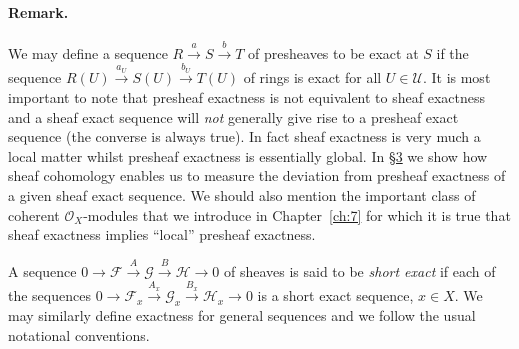 \paragraph{Remark.}
We may define a sequence $R\xrightarrow{a}S\xrightarrow{b}T$ of presheaves to be exact at $S$ if the sequence $R(U)\xrightarrow{a_U}S(U)\xrightarrow{b_U}T(U)$ of rings is exact for all $U\in\mathcal U$. It is most important to note that presheaf exactness is not equivalent to sheaf exactness and a sheaf exact sequence will \emph{not} generally give rise to a presheaf exact sequence (the converse is always true). In fact sheaf exactness is very much a local matter whilst presheaf exactness is essentially global. In \hyperref[sec:6:3]{\S3} we show how sheaf cohomology enables us to measure the deviation from presheaf exactness of a given sheaf exact sequence. We should also mention the important class of coherent $\mathcal O_X$-modules that we introduce in Chapter~\ref{ch:7} for which it is true that sheaf exactness implies ``local'' presheaf exactness.

A sequence $0\to\mathcal F\xrightarrow{A}\mathcal G\xrightarrow{B}\mathcal H\to0$ of sheaves is said to be \emph{short exact} if each of the sequences $0\to\mathcal F_x\xrightarrow{A_x}\mathcal G_x\xrightarrow{B_x}\mathcal H_x\to0$ is a short exact sequence, $x\in X$. We may similarly define exactness for general sequences and we follow the usual notational conventions.

